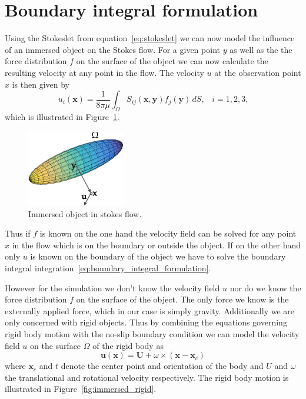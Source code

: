 \documentclass[a4paper,11pt]{kth-mag}
\begin{document}
\section{Boundary integral formulation}

Using the Stokeslet from equation~\eqref{eq:stokeslet} we can now model the influence of an immersed object on the Stokes flow. For a given point $y$ as well as the the force distribution $f$ on the surface of the object we can now calculate the resulting velocity at any point in the flow. The velocity $u$ at the observation point $x$ is then given by
\begin{equation}
  \label{eq:boundary_integral_formulation}
  u_i(\mathbf{x}) = \frac{1}{8\pi\mu}\int_{\Omega}S_{ij}(\mathbf{x},\mathbf{y})f_j(\mathbf{y}) \, dS \text{,} \quad i=1,2,3\text{,}
\end{equation}
which is illustrated in Figure~\ref{fig:immersed}.

\begin{figure}[!htbp]
  \centering
  \includegraphics[width=0.3819660112501450000000\textwidth]{img/immersed.png}
  \caption{Immersed object in stokes flow.}
  \label{fig:immersed}
\end{figure}

Thus if $f$ is known on the one hand the velocity field can be solved for any point $x$ in the flow which is on the boundary or outside the object. If on the other hand only $u$ is known on the boundary of the object we have to solve the boundary integral integration~\eqref{eq:boundary_integral_formulation}.

However for the simulation we don't know the velocity field $u$ nor do we know the force distribution $f$ on the surface of the object. The only force we know is the externally applied force, which in our case is simply gravity. Additionally we are only concerned with rigid objects. Thus by combining the equations governing rigid body motion with the no-slip boundary condition we can model the velocity field $u$ on the surface $\Omega$ of the rigid body as
\begin{equation}
  \label{eq:rigid_body_motion}
  \mathbf{u}(\mathbf{x}) = \mathbf{U} + \omega \times (\mathbf{x} - \mathbf{x}_c)
\end{equation}
where $\mathbf{x}_c$ and $t$ denote the center point and orientation of the body and $U$ and $\omega$ the translational and rotational velocity respectively. The rigid body motion is illustrated in Figure~\ref{fig:immersed_rigid}.
\end{document}

